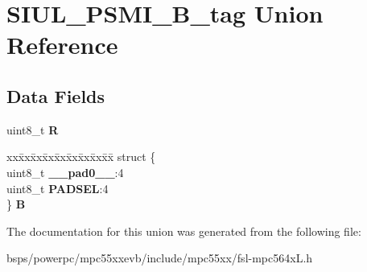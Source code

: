 \hypertarget{unionSIUL__PSMI__8B__tag}{}\section{S\+I\+U\+L\+\_\+\+P\+S\+M\+I\+\_\+B\+\_\+tag Union Reference}
\label{unionSIUL__PSMI__8B__tag}
\subsection*{Data Fields}
\begin{DoxyCompactItemize}
\item 
\mbox{\label{unionSIUL__PSMI__8B__tag_a9446d36c22ed9e5ca7831825395d5cd5}} 
uint8\+\_\+t {\bfseries R}
\item 
\mbox{\label{unionSIUL__PSMI__8B__tag_ace462a4b628c8584602cb33d53a1e952}} 
\begin{tabbing}
xx\=xx\=xx\=xx\=xx\=xx\=xx\=xx\=xx\=\kill
struct \{\\
\>uint8\_t {\bfseries \_\_pad0\_\_}:4\\
\>uint8\_t {\bfseries PADSEL}:4\\
\} {\bfseries B}\\

\end{tabbing}\end{DoxyCompactItemize}


The documentation for this union was generated from the following file\+:\begin{DoxyCompactItemize}
\item 
bsps/powerpc/mpc55xxevb/include/mpc55xx/fsl-\/mpc564x\+L.\+h\end{DoxyCompactItemize}
